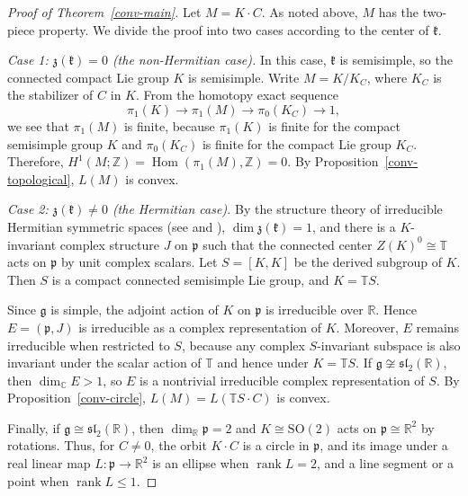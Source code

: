 \documentclass[11pt,reqno]{amsart}
\theoremstyle{remark}
\newcommand{\R}{\mathbb R}
\newcommand{\C}{\mathbb C}
\newcommand{\Z}{\mathbb Z}
\newcommand{\TT}{\mathbb T}
\newcommand{\gfr}{\mathfrak g}
\newcommand{\kfr}{\mathfrak k}
\newcommand{\pfr}{\mathfrak p}
\begin{document}
\begin{proof}[Proof of Theorem~\ref{conv-main}]
Let $M=K\cdot C$. As noted above, $M$ has the two-piece property.
We divide the proof into two cases according to the center of $\kfr$.

\emph{Case 1: $\mathfrak{z}(\kfr)=0$ (the non-Hermitian case).}
In this case, $\kfr$ is semisimple, so the connected compact Lie group
$K$ is semisimple. Write $M=K/K_C$, where $K_C$ is the stabilizer of $C$
in $K$. From the homotopy exact sequence
\[
 \pi_1(K)\longrightarrow\pi_1(M)
 \longrightarrow\pi_0(K_C)\longrightarrow1,
\]
we see that $\pi_1(M)$ is finite, because $\pi_1(K)$ is finite for the
compact semisimple group $K$ and $\pi_0(K_C)$ is finite for the compact
Lie group $K_C$. Therefore, $H^1(M;\Z)=\operatorname{Hom}(\pi_1(M),\Z)=0$.
By Proposition~\ref{conv-topological}, $L(M)$ is convex.

\emph{Case 2: $\mathfrak{z}(\kfr)\ne0$ (the Hermitian case).}
By the structure theory of irreducible Hermitian symmetric spaces (see
\cite[Chapter~VIII, Section~6, pages~514--518]{Helgason1978} and
\cite[Chapter~VII, Section~9]{Knapp2002}), $\dim\mathfrak{z}(\kfr)=1$,
and there is a $K$-invariant complex structure $J$ on $\pfr$ such that
the connected center $Z(K)^0\cong\TT$ acts on $\pfr$ by unit complex
scalars. Let $S=[K,K]$ be the derived subgroup of $K$. Then $S$ is a
compact connected semisimple Lie group, and $K=\TT S$.

Since $\gfr$ is simple, the adjoint action of $K$ on $\pfr$ is
irreducible over $\R$. Hence $E=(\pfr,J)$ is irreducible as a complex
representation of $K$. Moreover, $E$ remains irreducible when restricted
to $S$, because any complex $S$-invariant subspace is also invariant
under the scalar action of $\TT$ and hence under $K=\TT S$. If
$\gfr\not\cong\mathfrak{sl}_2(\R)$, then $\dim_\C E>1$, so $E$ is a
nontrivial irreducible complex representation of $S$. By
Proposition~\ref{conv-circle}, $L(M)=L(\TT S\cdot C)$ is convex.

Finally, if $\gfr\cong\mathfrak{sl}_2(\R)$, then $\dim_\R\pfr=2$ and
$K\cong\mathrm{SO}(2)$ acts on $\pfr\cong\R^2$ by rotations. Thus, for
$C\ne0$, the orbit $K\cdot C$ is a circle in $\pfr$, and its image under
a real linear map $L:\pfr\to\R^2$ is an ellipse when
$\operatorname{rank}L=2$, and a line segment or a point when
$\operatorname{rank}L\le1$.
\end{proof}
\end{document}
